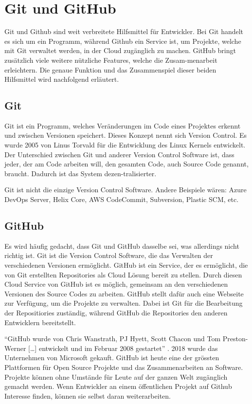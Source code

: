 \section{Git und GitHub}
\label{chap:git_github}
Git und Github sind weit verbreitete Hilfsmittel für Entwickler. Bei Git handelt
es sich um ein Programm, während Github ein Service ist, um Projekte, welche mit
Git verwaltet werden, in der Cloud zugänglich zu machen. GitHub bringt zusätzlich
viele weitere nützliche Features, welche die Zusam\hyp{}menarbeit erleichtern. Die
genaue Funktion und das Zusammenspiel dieser beiden Hilfsmittel wird nachfolgend
erläutert.

\subsection*{Git}
Git ist ein Programm, welches Veränderungen im Code eines Projektes erkennt und
zwischen Versionen speichert. Dieses Konzept nennt sich Version Control. Es
wurde 2005 von Linus Torvald für die Entwicklung des Linux Kernels entwickelt.
Der Unterschied zwischen Git und anderer Version Control Software ist, dass
jeder, der am Code arbeiten will, den gesamten Code, auch Source Code genannt,
braucht. Dadurch ist das System dezen\hyp{}tralisierter.
\cite{noauthor_git_2021}

Git ist nicht die einzige Version Control Software. Andere Beispiele wären:
Azure DevOps Server, Helix Core, AWS CodeCommit, Subversion, Plastic SCM, etc. 
\cite{noauthor_git_nodate-1}

\subsection*{GitHub}
Es wird häufig gedacht, dass Git und GitHub dasselbe sei, was allerdings nicht
richtig ist. Git ist die Version Control Software, die das Verwalten der
verschiedenen Versionen ermöglicht. GitHub ist ein Service, der es ermöglicht,
die von Git erstellten Repositories als Cloud Lösung bereit zu stellen. Durch
diesen Cloud Service von GitHub ist es möglich, gemeinsam an den verschiedenen
Versionen des Source Codes zu arbeiten. GitHub stellt dafür auch eine Webseite
zur Verfügung, um die Projekte zu verwalten. Dabei ist Git für die Bearbeitung
der Repositiories zuständig, während GitHub die Repositories den anderen
Entwicklern bereitstellt.
\cite{noauthor_github_2021} 

``GitHub wurde von Chris Wanstrath, PJ Hyett, Scott Chacon und Tom Preston-Werner
[\ldots] entwickelt und im Februar 2008 gestartet'' \cite{noauthor_github_2021}.
2018 wurde das Unternehmen von Microsoft gekauft. GitHub ist heute eine der
grössten Plattformen für Open Source Projekte und das Zusammenarbeiten an
Software. Projekte können ohne Umstände für Leute auf der ganzen Welt zugänglich
gemacht werden. Wenn Entwickler an einem öffentlichen Projekt auf Github
Interesse finden, können sie selbst daran weiterarbeiten. 
\cite{noauthor_github_2021}

